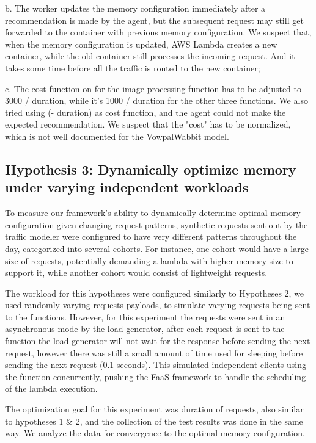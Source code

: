 \documentclass[conference]{IEEEtran}
\begin{document}
b. The worker updates the memory configuration immediately after a recommendation is made by the agent, but the subsequent request may still get forwarded to the container with previous memory configuration. We suspect that, when the memory configuration is updated, AWS Lambda creates a new container, while the old container still processes the incoming request. And it takes some time before all the traffic is routed to the new container;

c. The cost function on for the image processing function has to be adjusted to 3000 / duration, while it's 1000 / duration for the other three functions. We also tried using (- duration) as cost function, and the agent could not make the expected recommendation. We suspect that the "cost" has to be normalized, which is not well documented for the VowpalWabbit model.

\subsection{Hypothesis 3: Dynamically optimize memory under varying independent workloads}

To measure our framework's ability to dynamically determine optimal memory configuration given changing request patterns, synthetic requests sent out by the traffic modeler were configured to have very different patterns throughout the day, categorized into several cohorts. For instance, one cohort would have a large size of requests, potentially demanding a lambda with higher memory size to support it, while another cohort would consist of lightweight requests.

The workload for this hypotheses were configured similarly to Hypotheses 2, we used randomly varying requests payloads, to simulate varying requests being sent to the functions. However, for this experiment the requests were sent in an asynchronous mode by the load generator, after each request is sent to the function the load generator will not wait for the response before sending the next request, however there was still a small amount of time used for sleeping before sending the next request (0.1 seconds). This simulated independent clients using the function concurrently, pushing the FaaS framework to handle the scheduling of the lambda execution.

The optimization goal for this experiment was duration of requests, also similar to hypotheses 1 \& 2, and the collection of the test results was done in the same way. We analyze the data for convergence to the optimal memory configuration.
\end{document}
